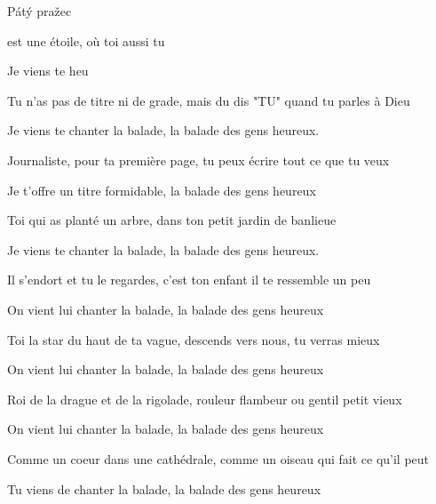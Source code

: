 

Pátý pražec

\zs
{} est une étoile, où toi aussi tu  

Je viens te      heu 
\ks

\zs
Tu n'as pas de titre ni de grade, mais du dis "TU" quand tu parles à Dieu

Je viens te chanter la balade, la balade des gens heureux. 
\ks

\zs
Journaliste, pour ta première page, tu peux écrire tout ce que tu veux

Je t'offre un titre formidable, la balade des gens heureux 
\ks

\zs
Toi qui as planté un arbre, dans ton petit jardin de banlieue

Je viens te chanter la balade, la balade des gens heureux. 
\ks

\zs
Il s'endort et tu le regardes, c'est ton enfant il te ressemble un peu

On vient lui chanter la balade, la balade des gens heureux 
\ks

\zs
Toi la star du haut de ta vague, descends vers nous, tu verras mieux

On vient lui chanter la balade, la balade des gens heureux 
\ks

\zs
Roi de la drague et de la rigolade, rouleur flambeur ou gentil petit vieux

On vient lui chanter la balade, la balade des gens heureux 
\ks

\zs
Comme un coeur dans une cathédrale, comme un oiseau qui fait ce qu'il peut

Tu viens de chanter la balade, la balade des gens heureux
\ks

\kp


